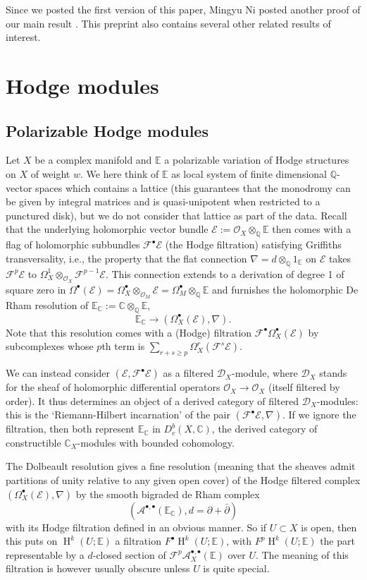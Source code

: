 \documentclass[12pt,letterpaper]{amsart}
\numberwithin{equation}{section}
\def\CC{{\mathbb C}}
\def\EE{{\mathbb E}}
\def\QQ{{\mathbb Q}}
\newcommand{\p}{\partial}
\def\Ascr{{\mathscr A}}
\def\Ecal{{\mathcal E}}
\def\Fcal{{\mathcal F}}
\def\Ocal{{\mathcal O}}
\def\Dscr{{\mathscr D}}
\def\pt{{\scriptscriptstyle\bullet}}
\newcommand\Hl{\operatorname{H}}
\theoremstyle{remark}
\begin{document}
Since  we  posted  the first version of this paper, Mingyu Ni posted another proof of our main result  \cite{ni}. This preprint  also contains 
several other related results of interest.


\section{Hodge modules}
\subsection{Polarizable Hodge modules} Let $X$ be a complex  manifold  and $\EE$ a polarizable variation of  Hodge structures 
on $X$ of weight $w$. We here think of $\EE$ as local system of 
finite dimensional  $\QQ$-vector spaces which contains a lattice (this guarantees that the monodromy can 
be given by integral matrices and is quasi-unipotent when restricted to a punctured disk), 
but we do not consider that lattice as part of the data. Recall that the underlying holomorphic vector bundle  
$\Ecal:=\Ocal_X\otimes_\QQ \EE$  then comes with a flag of holomorphic subbundles  $\Fcal^\pt\Ecal$ 
(the Hodge filtration) satisfying  Griffiths transversality, i.e., the property  that  the flat connection 
$\nabla=d\otimes_\QQ 1_\EE$ on $\Ecal$ takes 
$\Fcal^p\Ecal$ to $\Omega^1_X\otimes_{\Ocal_X}\Fcal^{p-1}\Ecal$. This connection extends to
a derivation of degree 1 of square  zero  in $\Omega^\pt(\Ecal)=\Omega^\pt_X\otimes_{\Ocal_M}\Ecal=\Omega^\pt_M\otimes_\QQ \EE$  and furnishes  the holomorphic De Rham resolution of $\EE_\CC:=\CC\otimes_\QQ \EE$,
\[
\EE_\CC\to (\Omega^\pt_X(\Ecal), \nabla).
\]
Note that this resolution  comes with a  (Hodge) filtration $\Fcal^\pt\Omega^\pt_X(\Ecal)$ by subcomplexes whose $p$th term is $\sum_{r+s\ge p}\Omega^r_X(\Fcal^s\Ecal)$.  

We can instead consider  $(\Ecal, \Fcal^\pt\Ecal)$ as a filtered $\Dscr_X$-module,  
where $\Dscr_X$ stands for the sheaf of holomorphic differential operators $\Ocal_X\to \Ocal_X$ (itself  filtered by order). 
It thus determines an object of a derived category of filtered $\Dscr_X$-modules: this  is the  
`Riemann-Hilbert incarnation' of  the pair $(\Fcal^\pt\Ecal, \nabla)$. 
If we ignore the filtration, then both represent $\EE_\CC$ in  $D_c^b(X,\CC)$, 
the derived category of constructible $\CC_X$-modules  with bounded cohomology. 

The  Dolbeault resolution gives  a fine resolution (meaning that the sheaves  admit partitions of unity relative to any given open cover) of the  Hodge filtered     complex  $(\Omega^\pt_X(\Ecal), \nabla)$ by the smooth bigraded de Rham complex  
\[
(\Ascr^{\pt,\pt}(\EE_\CC), d=\p +\bar\p)
\]
  with its Hodge filtration defined in an obvious manner. 
So if $U\subset X$ is open, then this puts on $\Hl^k(U; \EE)$ a filtration $F^\pt\Hl^k(U; \EE)$, with $F^p\Hl^k(U; \EE)$
the part representable by a $d$-closed section of $\Fcal^p\Ascr_X^{\pt, \pt}(\EE)$ over $U$. 
The meaning of this filtration is however usually obscure unless  $U$ is quite special.
\end{document}

